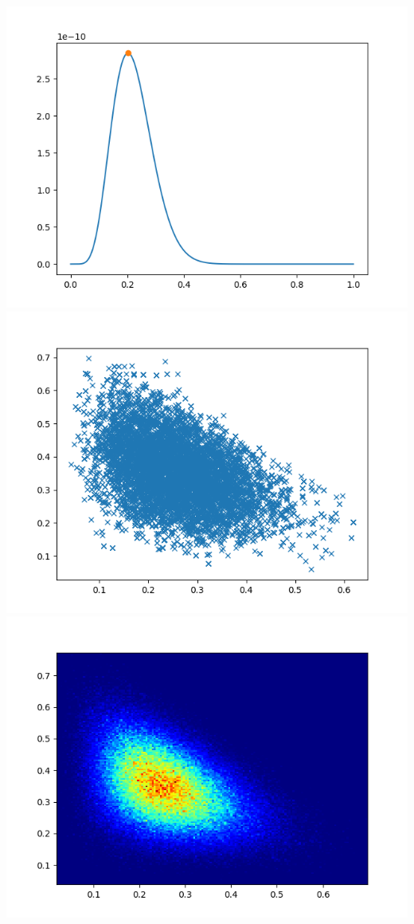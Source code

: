 \documentclass[pt12]{article}
\begin{document}
\newpage

\begin{center}
\includegraphics[scale=0.5]{hip25.png}\\
\includegraphics[scale=0.5]{sc25.png}\\
\includegraphics[scale=0.5]{den25.png}\\
\end{center}
\end{document}
